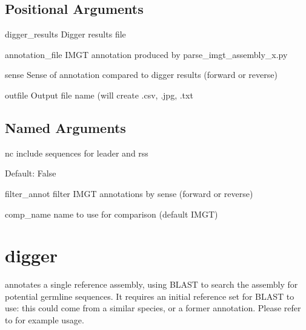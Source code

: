 \documentclass[letterpaper,10pt,english]{sphinxmanual}
\begin{document}
\subsection{Positional Arguments}
\label{\detokenize{tools/compare_annotations:positional-arguments}}\begin{optionlist}{3cm}
\item [digger\_results]  
\sphinxAtStartPar
Digger results file
\item [annotation\_file]  
\sphinxAtStartPar
IMGT annotation produced by parse\_imgt\_assembly\_x.py
\item [sense]  
\sphinxAtStartPar
Sense of annotation compared to digger results (forward or reverse)
\item [outfile]  
\sphinxAtStartPar
Output file name (will create .csv, .jpg, .txt
\end{optionlist}


\subsection{Named Arguments}
\label{\detokenize{tools/compare_annotations:named-arguments}}\begin{optionlist}{3cm}
\item [\sphinxhyphen{}nc]  
\sphinxAtStartPar
include sequences for leader and rss

\sphinxAtStartPar
Default: False
\item [\sphinxhyphen{}\sphinxhyphen{}filter\_annot]  
\sphinxAtStartPar
filter IMGT annotations by sense (forward or reverse)
\item [\sphinxhyphen{}\sphinxhyphen{}comp\_name]  
\sphinxAtStartPar
name to use for comparison (default IMGT)
\end{optionlist}

\sphinxstepscope


\section{digger}
\label{\detokenize{tools/digger:digger}}\label{\detokenize{tools/digger:id1}}\label{\detokenize{tools/digger::doc}}
\sphinxAtStartPar
{} annotates a single reference assembly, using BLAST to search the assembly for potential germline sequences. It requires an initial reference set
for BLAST to use: this could come from a similar species, or a former annotation.
Please refer to {\hyperref[\detokenize{examples/human_igh:human-igh}]{}} for example usage.
\end{document}
